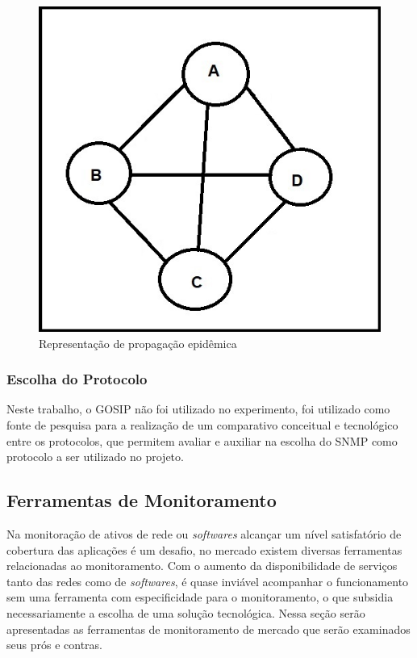 \begin{figure}[H]
	\begin{center}
	\includegraphics[scale = 0.70]{img/gosip_referecia.jpg}
		\caption{Representação de propagação epidêmica \cite{manoj2014comparative}}
		\label{fun:fig:gosip}
	\end{center}
\end{figure}

\subsubsection{Escolha do Protocolo}

Neste trabalho, o \acrshort{GOSIP} não foi utilizado no experimento, foi utilizado como fonte de pesquisa para a realização de um comparativo conceitual e  tecnológico entre os protocolos, que permitem avaliar e auxiliar na escolha do \acrshort{SNMP} como protocolo a ser utilizado no projeto. 


\subsection{Ferramentas de Monitoramento}

Na monitoração de ativos de rede ou \textit{softwares} alcançar um nível satisfatório de cobertura das aplicações é um desafio, no mercado existem diversas ferramentas relacionadas ao monitoramento. Com o aumento da disponibilidade de serviços tanto das redes como de \textit{softwares}, é quase inviável acompanhar o funcionamento sem uma ferramenta com especificidade para o monitoramento, o que subsidia necessariamente a escolha de uma solução tecnológica. Nessa seção serão apresentadas as ferramentas de monitoramento de mercado que serão examinados seus prós e contras.

